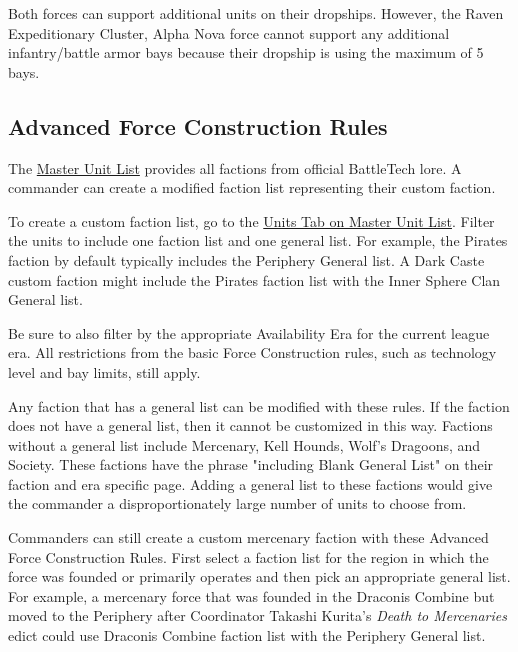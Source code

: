 \documentclass{article}
\begin{document}
Both forces can support additional units on their dropships.
However, the Raven Expeditionary Cluster, Alpha Nova force cannot support any additional infantry/battle armor bays because their dropship is using the maximum of 5 bays.

\newpage

\subsection{Advanced Force Construction Rules}

The \href{http://www.masterunitlist.info/}{Master Unit List} provides all factions from official BattleTech lore.
A commander can create a modified faction list representing their custom faction.

To create a custom faction list, go to the \href{http://www.masterunitlist.info/Unit/Filter}{Units Tab on Master Unit List}.
Filter the units to include one faction list and one general list.
For example, the Pirates faction by default typically includes the Periphery General list.
A Dark Caste custom faction might include the Pirates faction list with the Inner Sphere Clan General list.

Be sure to also filter by the appropriate Availability Era for the current league era.
All restrictions from the basic Force Construction rules, such as technology level and bay limits, still apply.

Any faction that has a general list can be modified with these rules.
If the faction does not have a general list, then it cannot be customized in this way.
Factions without a general list include Mercenary, Kell Hounds, Wolf's Dragoons, and Society.
These factions have the phrase "including Blank General List" on their faction and era specific page.
Adding a general list to these factions would give the commander a disproportionately large number of units to choose from.

Commanders can still create a custom mercenary faction with these Advanced Force Construction Rules.
First select a faction list for the region in which the force was founded or primarily operates and then pick an appropriate general list.
For example, a mercenary force that was founded in the Draconis Combine but moved to the Periphery after Coordinator Takashi Kurita's \emph{Death to Mercenaries} edict could use Draconis Combine faction list with the Periphery General list.
\end{document}
